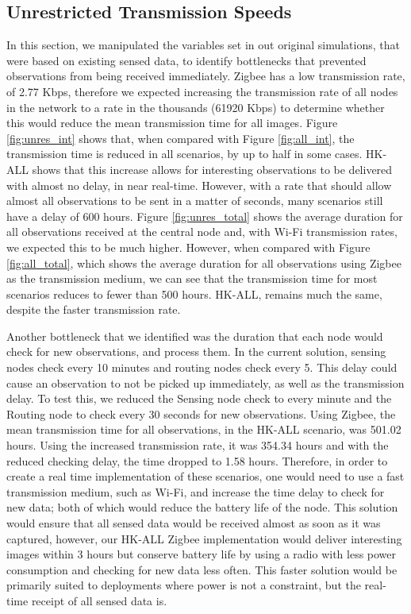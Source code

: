 \subsection{Unrestricted Transmission Speeds}
In this section, we manipulated the variables set in out original simulations, that were based on existing sensed data, to identify bottlenecks that prevented observations from being received immediately. Zigbee has a low transmission rate, of 2.77 Kbps, therefore we expected increasing the transmission rate of all nodes in the network to a rate in the thousands (61920 Kbps) to determine whether this would reduce the mean transmission time for all images. Figure \ref{fig:unres_int} shows that, when compared with Figure \ref{fig:all_int}, the transmission time is reduced in all scenarios, by up to half in some cases. HK-ALL shows that this increase allows for interesting observations to be delivered with almost no delay, in near real-time. However, with a rate that should allow almost all observations to be sent in a matter of seconds, many scenarios still have a delay of 600 hours. Figure \ref{fig:unres_total} shows the average duration for all observations received at the central node and, with Wi-Fi transmission rates, we expected this to be much higher. However, when compared with Figure \ref{fig:all_total}, which shows the average duration for all observations using Zigbee as the transmission medium, we can see that the transmission time for most scenarios reduces to fewer than 500 hours. HK-ALL, remains much the same, despite the faster transmission rate. 

Another bottleneck that we identified was the duration that each node would check for new observations, and process them. In the current solution, sensing nodes check every 10 minutes and routing nodes check every 5. This delay could cause an observation to not be picked up immediately, as well as the transmission delay. To test this, we reduced the Sensing node check to every minute and the Routing node to check every 30 seconds for new observations. Using Zigbee, the mean transmission time for all observations, in the HK-ALL scenario, was 501.02 hours. Using the increased transmission rate, it was 354.34 hours and with the reduced checking delay, the time dropped to 1.58 hours. Therefore, in order to create a real time implementation of these scenarios, one would need to use a fast transmission medium, such as Wi-Fi, and increase the time delay to check for new data; both of which would reduce the battery life of the node. This solution would ensure that all sensed data would be received almost as soon as it was captured, however, our HK-ALL Zigbee implementation would deliver interesting images within 3 hours but conserve battery life by using a radio with less power consumption and checking for new data less often. This faster solution would be primarily suited to deployments where power is not a constraint, but the real-time receipt of all sensed data is.

